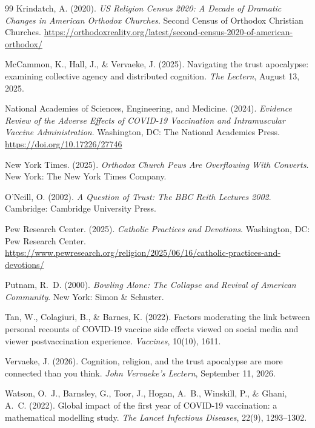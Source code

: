 \documentclass[11pt]{article}
\begin{document}
\begin{thebibliography}{99}
Krindatch, A. (2020). \textit{US Religion Census 2020: A Decade of Dramatic Changes in American Orthodox Churches}. Second Census of Orthodox Christian Churches. \url{https://orthodoxreality.org/latest/second-census-2020-of-american-orthodox/}

McCammon, K., Hall, J., \& Vervaeke, J. (2025). Navigating the trust apocalypse: examining collective agency and distributed cognition. \textit{The Lectern}, August 13, 2025.

National Academies of Sciences, Engineering, and Medicine. (2024). \textit{Evidence Review of the Adverse Effects of COVID-19 Vaccination and Intramuscular Vaccine Administration}. Washington, DC: The National Academies Press. \url{https://doi.org/10.17226/27746}

New York Times. (2025). \textit{Orthodox Church Pews Are Overflowing With Converts}. New York: The New York Times Company.

O'Neill, O. (2002). \textit{A Question of Trust: The BBC Reith Lectures 2002}. Cambridge: Cambridge University Press.

Pew Research Center. (2025). \textit{Catholic Practices and Devotions}. Washington, DC: Pew Research Center. \url{https://www.pewresearch.org/religion/2025/06/16/catholic-practices-and-devotions/}

Putnam, R.~D. (2000). \textit{Bowling Alone: The Collapse and Revival of American Community}. New York: Simon \& Schuster.

Tan, W., Colagiuri, B., \& Barnes, K. (2022). Factors moderating the link between personal recounts of COVID-19 vaccine side effects viewed on social media and viewer postvaccination experience. \textit{Vaccines}, 10(10), 1611.

Vervaeke, J. (2026). Cognition, religion, and the trust apocalypse are more connected than you think. \textit{John Vervaeke's Lectern}, September 11, 2026.

Watson, O.~J., Barnsley, G., Toor, J., Hogan, A.~B., Winskill, P., \& Ghani, A.~C. (2022). Global impact of the first year of COVID-19 vaccination: a mathematical modelling study. \textit{The Lancet Infectious Diseases}, 22(9), 1293--1302.

\end{thebibliography}
\end{document}
